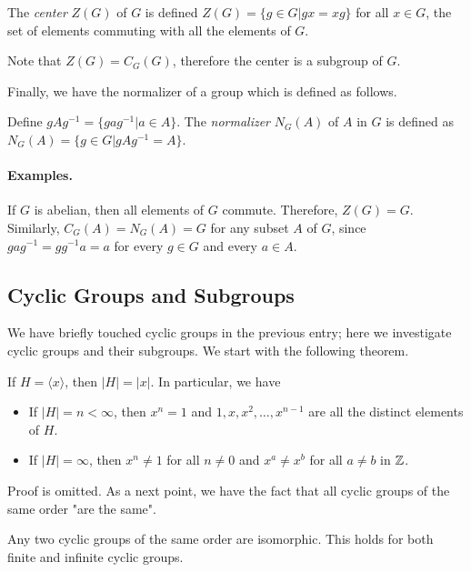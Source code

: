 \begin{definition}
The \emph{center} $Z(G)$ of $G$ is defined $Z(G) =\{g \in G | gx = xg \}$ for all $x \in G$, the set of elements commuting with all the elements of $G$. 
\end{definition}

Note that $Z(G) = C_G(G)$, therefore the center is a subgroup of $G$.

Finally, we have the normalizer of a group which is defined as follows.

\begin{definition}
Define $gAg^{-1} = \{gag^{-1} | a \in A\}$. The \emph{normalizer} $N_G(A)$ of $A$ in $G$ is defined as $N_G(A) =\{g \in G | gAg^{-1} = A\}$.
\end{definition}

\paragraph{Examples.} If $G$ is abelian, then all elements of $G$ commute. Therefore, $Z(G) = G$. Similarly, $C_G(A) = N_G(A) = G$ for any subset $A$ of $G$, since $gag^{-1} = gg^{-1}a = a$ for every $g \in G$ and every $a \in A$.


\subsection{Cyclic Groups and Subgroups}

We have briefly touched cyclic groups in the previous entry; here we investigate cyclic groups and their subgroups. We start with the following theorem.

\begin{theorem}
If $H = \langle x \rangle$, then $|H| = |x|$. In particular, we have

\begin{itemize}
\item If $|H| = n < \infty$, then $x^n = 1$ and $1, x, x^2, \ldots, x^{n-1}$ are all the distinct elements of $H$.
\item If $|H| = \infty$, then $x^n \neq 1$ for all $n \neq 0$ and $x^a \neq x^b$ for all $a \neq b$ in $\mathbb{Z}$.
\end{itemize}

\end{theorem}

Proof is omitted. As a next point, we have the fact that all cyclic groups of the same order "are the same".

\begin{theorem}
Any two cyclic groups of the same order are isomorphic. This holds for both finite and infinite cyclic groups.	
\end{theorem}

